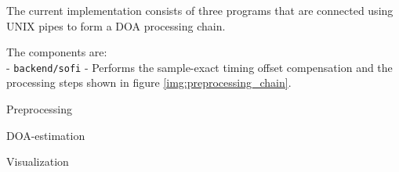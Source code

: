 The current implementation consists of three
programs that are connected using UNIX pipes
to form a DOA processing chain.

The components are: \\

- \texttt{backend/sofi} - Performs the sample-exact
timing offset compensation and the processing steps
shown in figure \ref{img:preprocessing_chain}.

\begin{subchapter}{Preprocessing}
\end{subchapter}

\begin{subchapter}{DOA-estimation}
\end{subchapter}

\begin{subchapter}{Visualization}
\end{subchapter}
